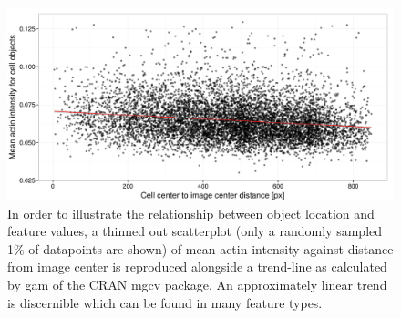 \begin{knitrout}
\color{fgcolor}\begin{figure}

{\centering \includegraphics[width=.95\linewidth]{figures/R/location-trends-data-location-trend-1} 

}

\caption[Scatterplot visualization showing mean actin intensity against object distance from image center alongside a trend line.]{In order to illustrate the relationship between object location and feature values, a thinned out scatterplot (only a randomly sampled 1\% of datapoints are shown) of mean actin intensity against distance from image center is reproduced alongside a trend-line as calculated by gam of the CRAN mgcv package. An approximately linear trend is discernible which can be found in many feature types.}\label{fig:data-location-trend}
\end{figure}


\end{knitrout}
